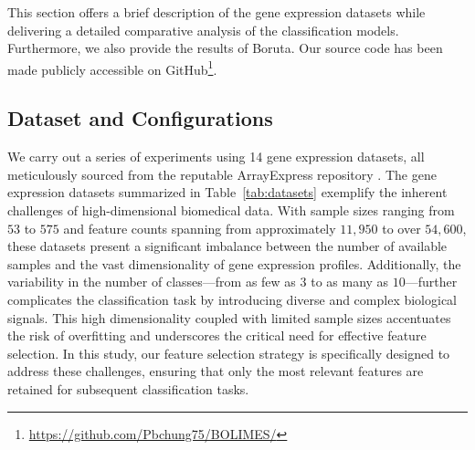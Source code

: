 This section offers a brief description of the gene expression datasets while delivering a detailed comparative analysis of the classification models. Furthermore, we also provide the results of Boruta. Our source code has been made publicly accessible on GitHub\footnote{\url{https://github.com/Pbchung75/BOLIMES/}}.

 \subsection{Dataset and Configurations}
We carry out a series of experiments using 14 gene expression datasets, all meticulously sourced from the reputable ArrayExpress repository \cite{brazma2003arrayexpress}. The gene expression datasets \cite{do2024enhancing} summarized in Table~\ref{tab:datasets} exemplify the inherent challenges of high-dimensional biomedical data. With sample sizes ranging from $53$ to $575$ and feature counts spanning from approximately $11,950$ to over $54,600$, these datasets present a significant imbalance between the number of available samples and the vast dimensionality of gene expression profiles. Additionally, the variability in the number of classes—from as few as $3$ to as many as $10$—further complicates the classification task by introducing diverse and complex biological signals. 
This high dimensionality coupled with limited sample sizes accentuates the risk of overfitting and underscores the critical need for effective feature selection. 
In this study, our feature selection strategy is specifically designed to address these challenges, ensuring that only the most relevant features are retained for subsequent classification tasks.

